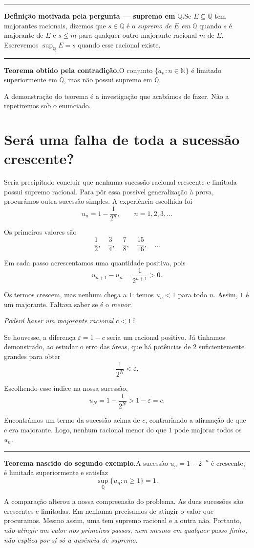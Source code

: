 \documentclass[11pt,a4paper]{article}
\newcommand{\Q}{\mathbb{Q}}
\newcommand{\N}{\mathbb{N}}
\newcommand{\questao}[1]{\par\medskip\noindent\textit{#1}\par\smallskip}
\newcommand{\assentado}[2]{%
\par\medskip\noindent\begingroup\color{azul}\rule{\linewidth}{0.45pt}\par\smallskip
\noindent\textbf{#1.}\enspace #2\par\endgroup\medskip}
\begin{document}
\assentado{Definição motivada pela pergunta --- supremo em $\Q$}{Se $E\subseteq\Q$ tem majorantes racionais, dizemos que $s\in\Q$ é o \emph{supremo de $E$ em $\Q$} quando $s$ é majorante de $E$ e $s\le m$ para qualquer outro majorante racional $m$ de $E$. Escrevemos $\sup_{\Q}E=s$ quando esse racional existe.}

\assentado{Teorema obtido pela contradição}{O conjunto $\{a_n:n\in\N\}$ é limitado superiormente em $\Q$, mas não possui supremo em $\Q$.}

A demonstração do teorema é a investigação que acabámos de fazer. Não a repetiremos sob o enunciado.

\section{Será uma falha de toda a sucessão crescente?}

Seria precipitado concluir que nenhuma sucessão racional crescente e limitada possui supremo racional. Para pôr essa possível generalização à prova, procurámos outra sucessão simples. A experiência escolhida foi
\[
 u_n=1-\frac1{2^n},\qquad n=1,2,3,\ldots
\]

Os primeiros valores são
\[
 \frac12,\quad\frac34,\quad\frac78,\quad\frac{15}{16},\quad\ldots
\]

Em cada passo acrescentamos uma quantidade positiva, pois
\[
 u_{n+1}-u_n=\frac1{2^{n+1}}>0.
\]

Os termos crescem, mas nenhum chega a $1$: temos $u_n<1$ para todo $n$. Assim, $1$ é um majorante. Faltava saber se é o \emph{menor}.

\questao{Poderá haver um majorante racional $c<1$?}

Se houvesse, a diferença $\varepsilon=1-c$ seria um racional positivo. Já tínhamos demonstrado, ao estudar o erro das áreas, que há potências de $2$ suficientemente grandes para obter
\[
 \frac1{2^N}<\varepsilon.
\]

Escolhendo esse índice na nossa sucessão,
\[
 u_N=1-\frac1{2^N}>1-\varepsilon=c.
\]

Encontrámos um termo da sucessão acima de $c$, contrariando a afirmação de que $c$ era majorante. Logo, nenhum racional menor do que $1$ pode majorar todos os $u_n$.

\assentado{Teorema nascido do segundo exemplo}{A sucessão $u_n=1-2^{-n}$ é crescente, é limitada superiormente e satisfaz
\[
 \sup_{\Q}\{u_n:n\ge1\}=1.
\]}

A comparação alterou a nossa compreensão do problema. As duas sucessões são crescentes e limitadas. Em nenhuma precisamos de atingir o valor que procuramos. Mesmo assim, uma tem supremo racional e a outra não. Portanto, \emph{não atingir um valor nos primeiros passos, nem mesmo em qualquer passo finito, não explica por si só a ausência de supremo}.
\end{document}
